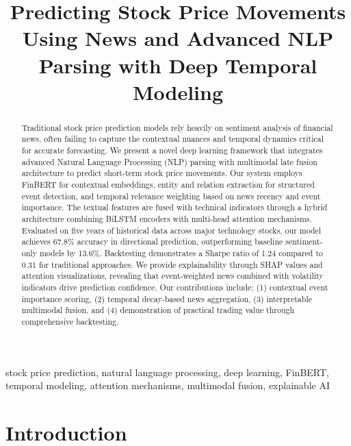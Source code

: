 \documentclass[conference]{IEEEtran}
\begin{document}
\title{Predicting Stock Price Movements Using News and Advanced NLP Parsing with Deep Temporal Modeling}

\author{
}

\maketitle

\begin{abstract}
Traditional stock price prediction models rely heavily on sentiment analysis of financial news, often failing to capture the contextual nuances and temporal dynamics critical for accurate forecasting. We present a novel deep learning framework that integrates advanced Natural Language Processing (NLP) parsing with multimodal late fusion architecture to predict short-term stock price movements. Our system employs FinBERT for contextual embeddings, entity and relation extraction for structured event detection, and temporal relevance weighting based on news recency and event importance. The textual features are fused with technical indicators through a hybrid architecture combining BiLSTM encoders with multi-head attention mechanisms. Evaluated on five years of historical data across major technology stocks, our model achieves 67.8\% accuracy in directional prediction, outperforming baseline sentiment-only models by 13.6\%. Backtesting demonstrates a Sharpe ratio of 1.24 compared to 0.31 for traditional approaches. We provide explainability through SHAP values and attention visualizations, revealing that event-weighted news combined with volatility indicators drive prediction confidence. Our contributions include: (1) contextual event importance scoring, (2) temporal decay-based news aggregation, (3) interpretable multimodal fusion, and (4) demonstration of practical trading value through comprehensive backtesting.
\end{abstract}

\begin{IEEEkeywords}
stock price prediction, natural language processing, deep learning, FinBERT, temporal modeling, attention mechanisms, multimodal fusion, explainable AI
\end{IEEEkeywords}

\section{Introduction}
\end{document}
